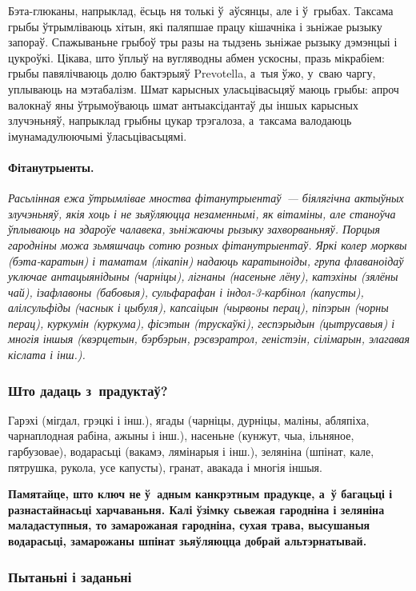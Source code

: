 Бэта-глюканы, напрыклад, ёсьць ня толькі ў~аўсянцы, але і ў~грыбах. Таксама грыбы ўтрымліваюць хітын, які паляпшае працу кішачніка і зьніжае рызыку запораў. Спажываньне грыбоў тры разы на тыдзень зьніжае рызыку дэмэнцыі і цукроўкі. Цікава, што ўплыў на вугляводны абмен ускосны, празь мікрабіем: грыбы павялічваюць долю бактэрыяў Prevotella, а~тыя ўжо, у~сваю чаргу, уплываюць на мэтабалізм. Шмат карысных уласьцівасьцяў маюць грыбы: апроч валокнаў яны ўтрымоўваюць шмат антыаксідантаў ды іншых карысных злучэньняў, напрыклад грыбны цукар трэгалоза, а~таксама валодаюць імунамадулюючымі ўласьцівасьцямі.

\paragraph{Фітанутрыенты.} \emph{Расьлінная ежа ўтрымлівае мноства фітанутрыентаў~--- біялягічна актыўных злучэньняў, якія хоць і не зьяўляюцца незаменнымі, як вітаміны, але станоўча ўплываюць на здароўе чалавека, зьніжаючы рызыку захворваньняў. Порцыя гародніны можа зьмяшчаць сотню розных фітанутрыентаў. Яркі колер морквы (бэта-каратын) і таматам (лікапін) надаюць каратыноіды, група флаваноідаў уключае антацыянідыны (чарніцы), лігнаны (насеньне лёну), катэхіны (зялёны чай), ізафлавоны (бабовыя), сульфарафан і індол-3-карбінол (капусты), алілсульфіды (часнык і цыбуля), капсаіцын (чырвоны перац), піпэрын (чорны перац), куркумін (куркума), фісэтын (трускаўкі), геспэрыдын (цытрусавыя) і многія іншыя (квэрцетын, бэрбэрын, рэсвэратрол, геністэін, сілімарын, элагавая кіслата і інш.).}

\subsubsection{Што дадаць з~прадуктаў?} 
Гарэхі (мігдал, грэцкі і інш.), ягады (чарніцы, дурніцы, маліны, абляпіха, чарнаплодная рабіна, ажыны і інш.), насеньне (кунжут, чыа, ільняное, гарбузовае), водарасьці (вакамэ, лямінарыя і інш.), зеляніна (шпінат, кале, пятрушка, рукола, усе капусты), гранат, авакада і многія іншыя. 

\textbf{Памятайце, што ключ не ў~адным канкрэтным прадукце, а~ў багацьці і разнастайнасьці харчаваньня. Калі ўзімку сьвежая гародніна і зеляніна маладаступныя, то замарожаная гародніна, сухая трава, высушаныя водарасьці, замарожаны шпінат зьяўляюцца добрай альтэрнатывай.}

\subsubsection{Пытаньні і заданьні}

